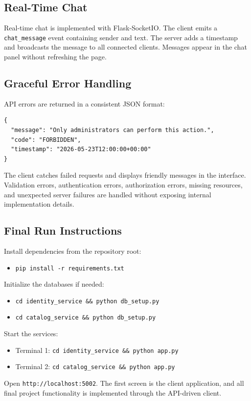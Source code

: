 \subsection{Real-Time Chat}

\par Real-time chat is implemented with Flask-SocketIO. The client emits a \texttt{chat\_message} event containing sender and text. The server adds a timestamp and broadcasts the message to all connected clients. Messages appear in the chat panel without refreshing the page.

\subsection{Graceful Error Handling}

\par API errors are returned in a consistent JSON format:
\begin{verbatim}
{
  "message": "Only administrators can perform this action.",
  "code": "FORBIDDEN",
  "timestamp": "2026-05-23T12:00:00+00:00"
}
\end{verbatim}

\par The client catches failed requests and displays friendly messages in the interface. Validation errors, authentication errors, authorization errors, missing resources, and unexpected server failures are handled without exposing internal implementation details.

\subsection{Final Run Instructions}

\par Install dependencies from the repository root:
\begin{itemize}
    \item \texttt{pip install -r requirements.txt}
\end{itemize}

\par Initialize the databases if needed:
\begin{itemize}
    \item \texttt{cd identity\_service \&\& python db\_setup.py}
    \item \texttt{cd catalog\_service \&\& python db\_setup.py}
\end{itemize}

\par Start the services:
\begin{itemize}
    \item Terminal 1: \texttt{cd identity\_service \&\& python app.py}
    \item Terminal 2: \texttt{cd catalog\_service \&\& python app.py}
\end{itemize}

\par Open \texttt{http://localhost:5002}. The first screen is the client application, and all final project functionality is implemented through the API-driven client.
